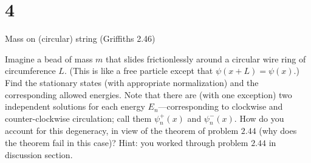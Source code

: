 \documentclass{article}
\begin{document}
\section*{4}
\begin{ques}
Mass on (circular) string (Griffiths 2.46)

Imagine a bead of mass $m$ that slides frictionlessly around a circular wire ring of circumference $L$. (This is like a free particle except that $\psi(x+L) = \psi(x)$.) Find the stationary states (with appropriate normalization) and the corresponding allowed energies. Note that there are (with one exception) two independent solutions for each energy $E_n$—corresponding to clockwise and counter-clockwise circulation; call them $\psi_n^+(x)$ and $\psi_n^-(x)$. How do you account for this degeneracy, in view of the theorem of problem $2.44$ (why does the theorem fail in this case)? Hint: you worked through problem $2.44$ in discussion section.
\end{ques}
\end{document}
